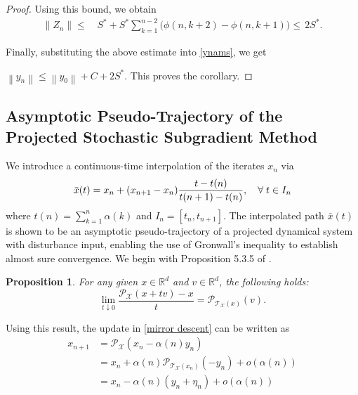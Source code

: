 \documentclass[9pt,journal,twoside,web]{ieeecolor}
\newtheorem{proposition}{Proposition}
\newcommand{\norm}[1]{\left\lVert #1 \right\rVert}
\begin{document}
\begin{proof}
Using this bound, we obtain
\begin{equation*}
    \begin{split}
        \norm{Z_n}
        \leq&
        \,
        S^\ast
        +
        S^\ast
        \sum_{k=1}^{n-2}
        \big(
        \phi(n,k+2)-\phi(n,k+1)
        \big)
        \leq
        \,
        2S^\ast.
    \end{split}
\end{equation*}

Finally, substituting the above estimate into \eqref{ynams}, we get

$ \norm{y_n}
    \leq
    \norm{y_0}
    +
    C
    +
    2S^\ast.$
This proves the corollary.
\end{proof}

\color{black}

\subsection{Asymptotic Pseudo-Trajectory of the Projected Stochastic Subgradient Method}
We introduce a continuous-time interpolation of the iterates ${x_n}$ via
\begin{equation}
    \begin{split}
        \Bar{x}(t) = x_n + (x_{n+1} -x_n) \frac{t - t(n)}{t(n+1)-t(n)}, \quad \forall \; t \in I_n
    \end{split}
    \label{CTI}
\end{equation}
where $t(n) = \sum\limits_{k=1}^{n} \alpha(k)$ and $I_n = [t_n,t_{n+1}]$.
The interpolated path $\bar{x}(t)$ is shown to be an asymptotic pseudo-trajectory of a projected dynamical system with disturbance input, enabling the use of Gronwall’s inequality to establish almost sure convergence. We begin with Proposition 5.3.5 of \cite{hiriart2013convex}.

\begin{proposition}
    For any given $x \in \mathbb{R}^d$ and $v \in \mathbb{R}^d$, the following holds: 
    \begin{equation*}
        \lim\limits_{t \downarrow 0} \frac{\mathcal{P}_\mathcal{X}(x+tv) - x}{t} = \mathcal{P}_{\mathcal{T}_\mathcal{X}(x)} (v).
    \end{equation*}
    \label{PDS}
\end{proposition}
Using this result, the update in \eqref{mirror descent} can be written as
\begin{equation*}
    \begin{split}
        x_{n+1} & = \mathcal{P}_\mathcal{X} (x_n -\alpha(n) y_n)
        \\ & = x_n + \alpha(n)  \mathcal{P}_{\mathcal{T}_\mathcal{X}(x_n)} (-y_n) + o(\alpha(n)) 
        \\ & = x_n - \alpha (n) ( y_n + \eta_n)  + o(\alpha(n))
    \end{split}
\end{equation*}
\end{document}
